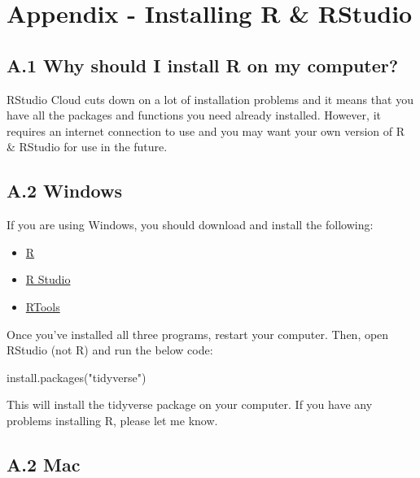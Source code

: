 \documentclass[
]{book}
\newenvironment{Shaded}{\begin{snugshade}}{\end{snugshade}}
\newcommand{\FunctionTok}[1]{\textcolor[rgb]{0.00,0.00,0.00}{#1}}
\newcommand{\NormalTok}[1]{#1}
\newcommand{\StringTok}[1]{\textcolor[rgb]{0.31,0.60,0.02}{#1}}
\begin{document}
\hypertarget{appendix---installing-r-rstudio}{%
\chapter{Appendix - Installing R \& RStudio}\label{appendix---installing-r-rstudio}}

\hypertarget{a.1-why-should-i-install-r-on-my-computer}{%
\section{A.1 Why should I install R on my computer?}\label{a.1-why-should-i-install-r-on-my-computer}}

RStudio Cloud cuts down on a lot of installation problems and it means that you have all the packages and functions you need already installed. However, it requires an internet connection to use and you may want your own version of R \& RStudio for use in the future.

\hypertarget{a.2-windows}{%
\section{A.2 Windows}\label{a.2-windows}}

If you are using Windows, you should download and install the following:

\begin{itemize}
\item
  \href{https://cran.r-project.org/bin/windows/base/}{R}
\item
  \href{https://www.rstudio.com/products/rstudio/download/\#download}{R Studio}
\item
  \href{https://cran.r-project.org/bin/windows/Rtools/}{RTools}
\end{itemize}

Once you've installed all three programs, restart your computer. Then, open RStudio (not R) and run the below code:

\begin{Shaded}
\begin{Highlighting}[]
\FunctionTok{install.packages}\NormalTok{(}\StringTok{"tidyverse"}\NormalTok{)}
\end{Highlighting}
\end{Shaded}

This will install the tidyverse package on your computer. If you have any problems installing R, please let me know.

\hypertarget{a.2-mac}{%
\section{A.2 Mac}\label{a.2-mac}}
\end{document}
